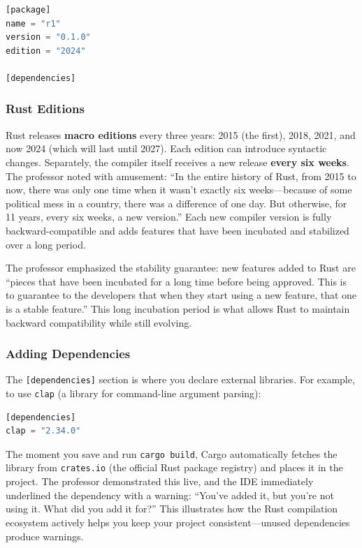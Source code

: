 \begin{lstlisting}[language=Rust]
[package]
name = "r1"
version = "0.1.0"
edition = "2024"

[dependencies]
\end{lstlisting}

\subsubsection{Rust Editions}

Rust releases \textbf{macro editions} every three years: 2015 (the first), 2018, 2021, and now 2024 (which will last until 2027). Each edition can introduce syntactic changes. Separately, the compiler itself receives a new release \textbf{every six weeks}. The professor noted with amusement: ``In the entire history of Rust, from 2015 to now, there was only one time when it wasn't exactly six weeks---because of some political mess in a country, there was a difference of one day. But otherwise, for 11 years, every six weeks, a new version.'' Each new compiler version is fully backward-compatible and adds features that have been incubated and stabilized over a long period.

\begin{insightbox}
The professor emphasized the stability guarantee: new features added to Rust are ``pieces that have been incubated for a long time before being approved. This is to guarantee to the developers that when they start using a new feature, that one is a stable feature.'' This long incubation period is what allows Rust to maintain backward compatibility while still evolving.
\end{insightbox}

\subsubsection{Adding Dependencies}

The \texttt{[dependencies]} section is where you declare external libraries. For example, to use \texttt{clap} (a library for command-line argument parsing):

\begin{lstlisting}[language=Rust]
[dependencies]
clap = "2.34.0"
\end{lstlisting}

The moment you save and run \texttt{cargo build}, Cargo automatically fetches the library from \texttt{crates.io} (the official Rust package registry) and places it in the project. The professor demonstrated this live, and the IDE immediately underlined the dependency with a warning: ``You've added it, but you're not using it. What did you add it for?'' This illustrates how the Rust compilation ecosystem actively helps you keep your project consistent---unused dependencies produce warnings.

